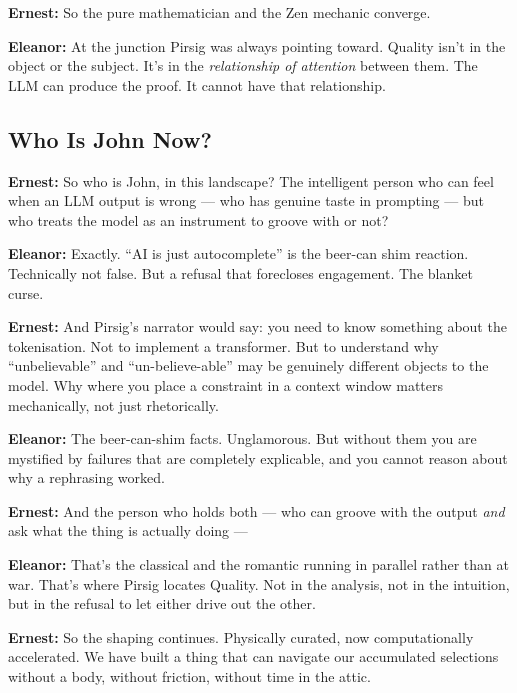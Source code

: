 \noindent\textbf{Ernest:} So the pure mathematician and the Zen mechanic converge.
 
\noindent\textbf{Eleanor:} At the junction Pirsig was always pointing toward. Quality isn't in the
object or the subject. It's in the \textit{relationship of attention} between them.
The LLM can produce the proof. It cannot have that relationship.
 
\vspace{1.5em}
 
\subsection*{Who Is John Now?}
 
\noindent\textbf{Ernest:} So who is John, in this landscape? The intelligent person who can feel when
an LLM output is wrong --- who has genuine taste in prompting --- but who treats
the model as an instrument to groove with or not?
 
\noindent\textbf{Eleanor:} Exactly. ``AI is just autocomplete'' is the beer-can shim reaction. Technically
not false. But a refusal that forecloses engagement. The blanket curse.
 
\noindent\textbf{Ernest:} And Pirsig's narrator would say: you need to know something about the
tokenisation. Not to implement a transformer. But to understand why
``unbelievable'' and ``un-believe-able'' may be genuinely different objects
to the model. Why where you place a constraint in a context window matters
mechanically, not just rhetorically.
 
\noindent\textbf{Eleanor:} The beer-can-shim facts. Unglamorous. But without them you are mystified
by failures that are completely explicable, and you cannot reason about
why a rephrasing worked.
 
\noindent\textbf{Ernest:} And the person who holds both --- who can groove with the output
\textit{and} ask what the thing is actually doing ---
 
\noindent\textbf{Eleanor:} That's the classical and the romantic running in parallel rather than
at war. That's where Pirsig locates Quality. Not in the analysis, not in
the intuition, but in the refusal to let either drive out the other.
 
\noindent\textbf{Ernest:} So the shaping continues. Physically curated, now computationally
accelerated. We have built a thing that can navigate our accumulated
selections without a body, without friction, without time in the attic.
 
